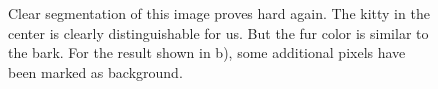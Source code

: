 \documentclass[11pt,a4paper]{article}
\begin{document}
\begin{figure}
\centering
{}
\quad
{}

\caption{Clear segmentation of this image proves hard again. The kitty in the center is clearly distinguishable for us. But the fur color is similar to the bark. For the result shown in b), some additional pixels have been marked as background.}%

\end{figure}
\end{document}
